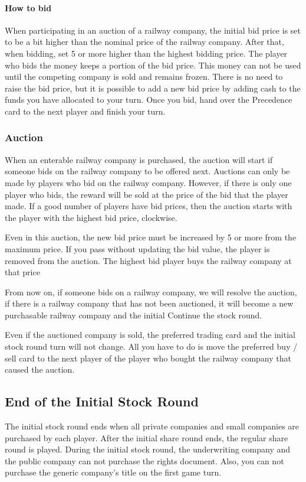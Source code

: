 \documentclass{article}
\begin{document}
\begin{CJK}{UTF8}{min}
\paragraph{How to bid}
When participating in an auction of a railway company, the initial bid
price is set to be a bit higher than the nominal price of the railway
company. After that, when bidding, set 5 or more higher than the
highest bidding price. The player who bids the money keeps a portion
of the bid price. This money can not be used until the competing
company is sold and remains frozen. There is no need to raise the bid
price, but it is possible to add a new bid price by adding cash to the
funds you have allocated to your turn. Once you bid, hand over the
Precedence card to the next player and finish your turn.

\subsubsection{Auction}
When an enterable railway company is purchased, the auction will start
if someone bids on the railway company to be offered next. Auctions
can only be made by players who bid on the railway company. However,
if there is only one player who bids, the reward will be sold at the
price of the bid that the player made. If a good number of players
have bid prices, then the auction starts with the player with the
highest bid price, clockwise.

Even in this auction, the new bid price must be increased by 5 or more
from the maximum price. If you pass without updating the bid value,
the player is removed from the auction. The highest bid player buys
the railway company at that price

From now on, if someone bids on a railway company, we will resolve the
auction, if there is a railway company that has not been auctioned, it
will become a new purchasable railway company and the initial Continue
the stock round.

Even if the auctioned company is sold, the preferred trading card and
the initial stock round turn will not change. All you have to do is
move the preferred buy / sell card to the next player of the player
who bought the railway company that caused the auction.

\subsection{End of the Initial Stock Round}
The initial stock round ends when all private companies and small
companies are purchased by each player. After the initial share round
ends, the regular share round is played. During the initial stock
round, the underwriting company and the public company can not
purchase the rights document. Also, you can not purchase the generic
company's title on the first game turn.


\end{CJK}
\end{document}
